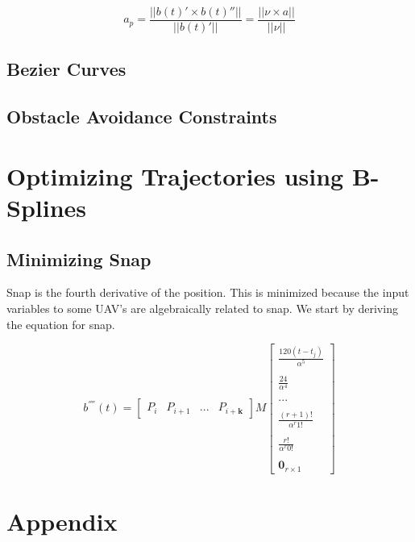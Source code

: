 \documentclass{article}
\begin{document}
\begin{equation}
    a_p = \frac{||b(t)' \times b(t)''||}{||b(t)'||} = \frac{||\nu \times a||}{||\nu||}
\end{equation}

\subsection{Bezier Curves}


\subsection{Obstacle Avoidance Constraints}

\section{Optimizing Trajectories using B-Splines}

\subsection{Minimizing Snap}

Snap is the fourth derivative of the position. This is minimized because the input variables to some UAV's are algebraically related to snap. We start by deriving the equation for snap.


\begin{equation}
    b^{''''}(t) = \begin{bmatrix} P_{i} & P_{i+1} & ... & P_{i+\textbf{k}}\end{bmatrix} M \begin{bmatrix}
    \frac{120(t-t_j)}{ \alpha^{5}} \\ \\ 
    \frac{24}{\alpha^{4}} \\ \\ 
    ... \\ \\ 
    \frac{(r+1)!}{\alpha^{r} 1!} \\ \\ 
    \frac{r!}{\alpha^r 0!} \\ \\ 
    \textbf{0}_{r \times 1} \end{bmatrix}
\end{equation}


\section{Appendix}
\end{document}
